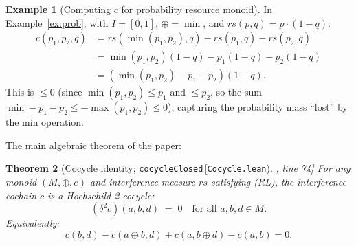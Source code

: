 \documentclass[acmsmall,sigplan,anonymous,review,screen]{acmart}
\theoremstyle{plain}
\newtheorem{theorem}{Theorem}[section]
\theoremstyle{definition}
\newtheorem{example}[theorem]{Example}
\newcommand{\rs}{\mathit{rs}}
\newcommand{\lean}[1]{\texttt{#1}}
\newcommand{\leancite}[2]{\lean{#1}\,[\texttt{#2}]}
\begin{document}
\begin{example}[Computing $c$ for probability resource monoid]
\label{ex:prob-c}
  In Example~\ref{ex:prob}, with $I = [0,1]$, $\oplus = \min$, and
  $\rs(p, q) = p \cdot (1-q)$:
  \begin{align*}
    c(p_1, p_2, q) &= \rs(\min(p_1, p_2), q) - \rs(p_1, q) - \rs(p_2, q) \\
    &= \min(p_1, p_2)(1-q) - p_1(1-q) - p_2(1-q) \\
    &= (\min(p_1, p_2) - p_1 - p_2)(1-q).
  \end{align*}
  This is $\leq 0$ (since $\min(p_1, p_2) \leq p_1$ and $\leq p_2$, so the
  sum $\min - p_1 - p_2 \leq -\max(p_1, p_2) \leq 0$), capturing the
  probability mass ``lost'' by the min operation.
\end{example}

The main algebraic theorem of the paper:

\begin{theorem}[Cocycle identity; \leancite{cocycleClosed}{Cocycle.lean}, line 74]
\label{thm:cocycle}
  For any monoid $(M, \oplus, e)$ and interference measure $\rs$
  satisfying \emph{(RL)}, the interference cochain $c$ is a Hochschild
  2-cocycle:
  \[
    (\delta^2 c)(a, b, d) \;=\; 0 \quad \text{for all } a, b, d \in M.
  \]
  Equivalently:
  \[
    c(b, d) - c(a \oplus b, d) + c(a, b \oplus d) - c(a, b) = 0.
  \]
\end{theorem}
\end{document}
